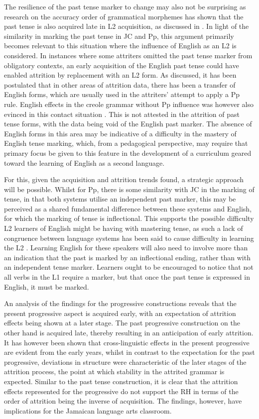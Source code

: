 \documentclass[output=paper,colorlinks,citecolor=brown]{langscibook}
\begin{document}
The resilience of the past tense marker to change may also not be surprising as research on the accuracy order of grammatical morphemes has shown that the past tense is also acquired late in L2 acquisition, as discussed in . In light of the similarity in marking the past tense in JC and Pp, this argument primarily becomes relevant to this situation where the influence of English as an L2 is considered.  In instances where some attriters omitted the past tense marker from obligatory contexts, an early acquisition of the English past tense could have enabled attrition by replacement with an L2 form. As discussed, it has been postulated that in other areas of attrition data, there has been a transfer of English forms, which are usually used in the attriters’ attempt to apply a Pp rule. English effects in the creole grammar without Pp influence was however also evinced in this contact situation \citep{Messam-Johnson2017}. This is not attested in the attrition of past tense forms, with the data being void of the English past marker. The absence of English forms in this area may be indicative of a difficulty in the mastery of English tense marking, which, from a pedagogical perspective, may require that primary focus be given to this feature in the development of a curriculum geared toward the learning of English as a second language.

For this, given the acquisition and attrition trends found, a strategic approach will be possible. Whilst for Pp, there is some similarity with JC in the marking of tense, in that both systems utilise an independent past marker, this may be perceived as a shared fundamental difference between these systems and English, for which the marking of tense is inflectional. This supports the possible difficulty L2 learners of English might be having with mastering tense, as such a lack of congruence between language systems has been said to cause difficulty in learning the L2 \citep[252]{winford2003book}. Learning English for these speakers will also need to involve more than an indication that the past is marked by an inflectional ending, rather than with an independent tense marker. Learners ought to be encouraged to notice that not all verbs in the L1 require a marker, but that once the past tense is expressed in English, it must be marked.

An analysis of the findings for the progressive constructions reveals that the present progressive aspect is acquired early, with an expectation of attrition effects being shown at a later stage. The past progressive construction on the other hand is acquired late, thereby resulting in an anticipation of early attrition. It has however been shown that cross-linguistic effects in the present progressive are evident from the early years, whilst in contrast to the expectation for the past progressive, deviations in structure were characteristic of the later stages of the attrition process, the point at which stability in the attrited grammar is expected. Similar to the past tense construction, it is clear that the attrition effects represented for the progressive do not support the RH in terms of the order of attrition being the inverse of acquisition. The findings, however, have implications for the Jamaican language arts classroom.
\end{document}
